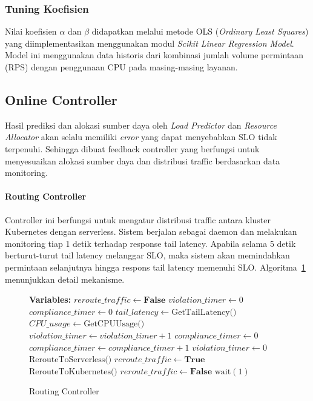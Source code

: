 \subsubsection{Tuning Koefisien}

Nilai koefisien $\alpha$ dan $\beta$ didapatkan melalui metode OLS (\emph{Ordinary Least Squares}) yang diimplementasikan menggunakan modul \emph{Scikit Linear Regression Model}. Model ini menggunakan data historis dari kombinasi jumlah volume permintaan (RPS) dengan penggunaan CPU pada masing-masing layanan.

\subsection{Online Controller}
\label{sec:online-controller}

Hasil prediksi dan alokasi sumber daya oleh \emph{Load Predictor} dan \emph{Resource Allocator} akan selalu memiliki \emph{error} yang dapat menyebabkan SLO tidak terpenuhi. Sehingga dibuat feedback controller yang berfungsi untuk menyesuaikan alokasi sumber daya dan distribusi traffic berdasarkan data monitoring.

\paragraph{Routing Controller}

Controller ini berfungsi untuk mengatur distribusi traffic antara kluster Kubernetes dengan serverless. Sistem berjalan sebagai daemon dan melakukan monitoring tiap 1 detik terhadap response tail latency. Apabila selama 5 detik berturut-turut tail latency melanggar SLO, maka sistem akan memindahkan permintaan selanjutnya hingga respons tail latency memenuhi SLO. Algoritma~\ref{alg:routing-controller} menunjukkan detail mekanisme.

\begin{figure}[htbp]
\caption{Routing Controller}
\label{alg:routing-controller}
\begin{algorithmic}[1]
\State \textbf{Variables:}
\State \quad $reroute\_traffic \gets \textbf{False}$
\State \quad $violation\_timer \gets 0$
\State \quad $compliance\_timer \gets 0$
\Repeat
    \State $tail\_latency \gets \text{GetTailLatency()}$
    \State $CPU\_usage \gets \text{GetCPUUsage()}$
        \State $violation\_timer \gets violation\_timer + 1$
        \State $compliance\_timer \gets 0$
    \Else
        \State $compliance\_timer \gets compliance\_timer + 1$
        \State $violation\_timer \gets 0$
    \EndIf
        \State $\text{RerouteToServerless()}$
        \State $reroute\_traffic \gets \textbf{True}$
        \State $\text{RerouteToKubernetes()}$
        \State $reroute\_traffic \gets \textbf{False}$
    \EndIf
    \State $\text{wait}(1)$ 
\end{algorithmic}
\end{figure}


